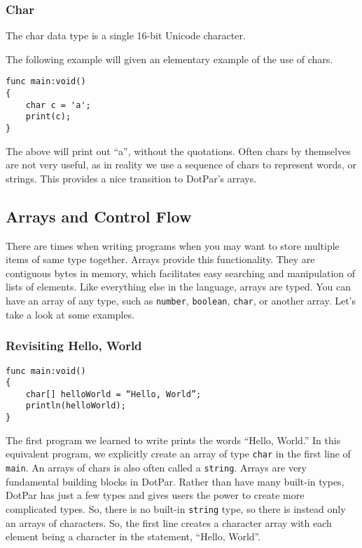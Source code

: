 \documentclass{article}
\begin{document}
\subsubsection{Char}
The char data type is a single 16-bit Unicode character. 

The following example will given an elementary example of the use of chars.

\begin{verbatim}
func main:void()
{
    char c = 'a';
    print(c);
}
\end{verbatim}

The above will print out “a”, without the quotations. Often chars by themselves are not very useful, as in reality we use a sequence of chars to represent words, or strings.  This provides a nice transition to DotPar’s arrays.

\subsection{Arrays and Control Flow}
There are times when writing programs when you may want to store multiple items of same type together. Arrays provide this functionality. They are contiguous bytes in memory, which facilitates easy searching and manipulation of lists of elements. Like everything else in the language, arrays are typed. You can have an array of any type, such as \verb!number!, \verb!boolean!, \verb!char!, or another array. Let’s take a look at some examples.

\subsubsection{Revisiting Hello, World}

\begin{verbatim}
func main:void()
{
    char[] helloWorld = “Hello, World”;
    println(helloWorld);
}
\end{verbatim}

The first program we learned to write prints the words “Hello, World.”  In this equivalent program, we explicitly create an array of type \verb!char! in the first line of \verb!main!. An arrays of chars is also often called a \verb!string!. Arrays are very fundamental building blocks in DotPar. Rather than have many built-in types, DotPar has just a few types and gives users the power to create more complicated types. So, there is no built-in \verb!string! type, so there is instead only an arrays of characters. So, the first line creates a character array with each element being a character in the statement, “Hello, World”.
\end{document}

